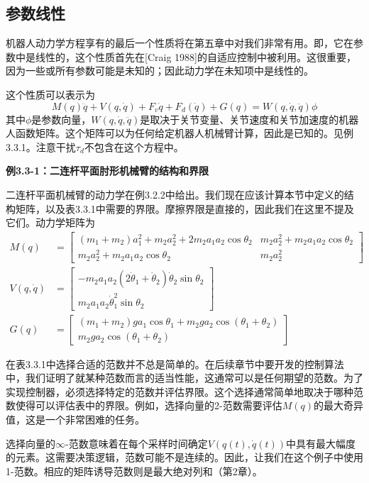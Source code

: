 \documentclass[12pt,a4paper]{ctexart}
\begin{document}
\subsection{参数线性}

机器人动力学方程享有的最后一个性质将在第五章中对我们非常有用。即，它在参数中是线性的，这个性质首先在[Craig 1988]的自适应控制中被利用。这很重要，因为一些或所有参数可能是未知的；因此动力学在未知项中是线性的。

这个性质可以表示为
\begin{equation}
M(q)\ddot{q} + V(q,\dot{q}) + F_v\dot{q} + F_d(\dot{q}) + G(q) = W(q,\dot{q},\ddot{q})\phi
\end{equation}
其中$\phi$是参数向量，$W(q,\dot{q},\ddot{q})$是取决于关节变量、关节速度和关节加速度的机器人函数矩阵。这个矩阵可以为任何给定机器人机械臂计算，因此是已知的。见例3.3.1。注意干扰$\tau_d$不包含在这个方程中。

\textbf{例3.3-1：二连杆平面肘形机械臂的结构和界限}

二连杆平面机械臂的动力学在例3.2.2中给出。我们现在应该计算本节中定义的结构矩阵，以及表3.3.1中需要的界限。摩擦界限是直接的，因此我们在这里不提及它们。动力学矩阵为
\begin{align}
M(q) &= \begin{bmatrix} (m_1+m_2)a_1^2 + m_2a_2^2 + 2m_2a_1a_2\cos\theta_2 & m_2a_2^2 + m_2a_1a_2\cos\theta_2 \\ m_2a_2^2 + m_2a_1a_2\cos\theta_2 & m_2a_2^2 \end{bmatrix} \\
V(q,\dot{q}) &= \begin{bmatrix} -m_2a_1a_2(2\dot{\theta}_1+\dot{\theta}_2)\dot{\theta}_2\sin\theta_2 \\ m_2a_1a_2\dot{\theta}_1^2\sin\theta_2 \end{bmatrix} \\
G(q) &= \begin{bmatrix} (m_1+m_2)ga_1\cos\theta_1 + m_2ga_2\cos(\theta_1+\theta_2) \\ m_2ga_2\cos(\theta_1+\theta_2) \end{bmatrix}
\end{align}

在表3.3.1中选择合适的范数并不总是简单的。在后续章节中要开发的控制算法中，我们证明了就某种范数而言的适当性能，这通常可以是任何期望的范数。为了实现控制器，必须选择特定的范数并评估界限。这个选择通常简单地取决于哪种范数使得可以评估表中的界限。例如，选择向量的2-范数需要评估$M(q)$的最大奇异值，这是一个非常困难的任务。

选择向量的$\infty$-范数意味着在每个采样时间确定$V(q(t),\dot{q}(t))$中具有最大幅度的元素。这需要决策逻辑，范数可能不是连续的。因此，让我们在这个例子中使用1-范数。相应的矩阵诱导范数则是最大绝对列和（第2章）。
\end{document}
